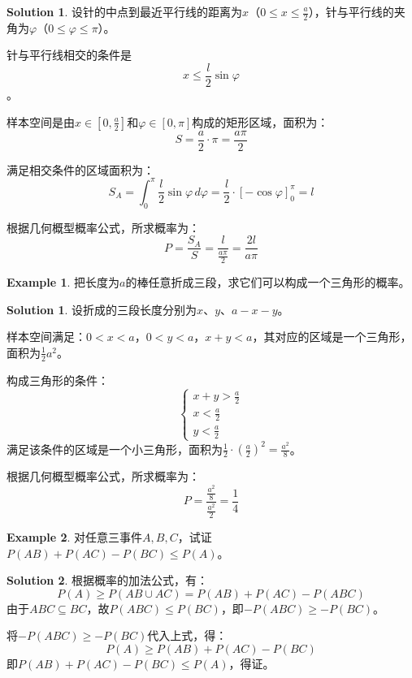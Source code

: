 \documentclass[oneside]{book}
\theoremstyle{definition}
\newtheorem{example}{Example}[section]
\newtheorem*{sol}{Solution}
\newtheorem*{solution}{Solution}
\begin{document}
	\begin{sol}
		设针的中点到最近平行线的距离为\( x \)（\( 0 \leq x \leq \frac{a}{2} \)），针与平行线的夹角为\( \varphi \)（\( 0 \leq \varphi \leq \pi \)）。
		
		针与平行线相交的条件是 \[x \leq \frac{l}{2} \sin\varphi \]。
		
		样本空间是由\( x \in [0, \frac{a}{2}] \)和\( \varphi \in [0, \pi] \)构成的矩形区域，面积为：
		\[
		S = \frac{a}{2} \cdot \pi = \frac{a\pi}{2}
		\]
		
		满足相交条件的区域面积为：
		\[
		S_A = \int_{0}^{\pi} \frac{l}{2} \sin\varphi \, d\varphi = \frac{l}{2} \cdot [-\cos\varphi]_{0}^{\pi} = l
		\]
		
		根据几何概型概率公式，所求概率为：
		\[
		P = \frac{S_A}{S} = \frac{l}{\frac{a\pi}{2}} = \frac{2l}{a\pi}
		\]
	\end{sol}
	\begin{example}
		把长度为\( a \)的棒任意折成三段，求它们可以构成一个三角形的概率。
	\end{example}
	
	\begin{solution}
		设折成的三段长度分别为\( x \)、\( y \)、\( a - x - y \)。
		
		样本空间满足：\( 0 < x < a \)，\( 0 < y < a \)，\( x + y < a \)，其对应的区域是一个三角形，面积为\( \frac{1}{2}a^2 \)。
		
		构成三角形的条件：
		\[
		\begin{cases}
			x + y > \frac{a}{2} \\
			x < \frac{a}{2} \\
			y < \frac{a}{2}
		\end{cases}
		\]
		满足该条件的区域是一个小三角形，面积为\( \frac{1}{2} \cdot \left( \frac{a}{2} \right)^2 = \frac{a^2}{8} \)。
		
		根据几何概型概率公式，所求概率为：
		\[
		P = \frac{\frac{a^2}{8}}{\frac{a^2}{2}} = \frac{1}{4}
		\]
	\end{solution}
	
	\begin{example}
		对任意三事件\( A,B,C \)，试证\( P(AB) + P(AC) - P(BC) \leq P(A) \)。
	\end{example}
	
	\begin{solution}
		根据概率的加法公式，有：
		\[
		P(A) \geq P(AB \cup AC) = P(AB) + P(AC) - P(ABC)
		\]
		由于\( ABC \subseteq BC \)，故\( P(ABC) \leq P(BC) \)，即\( -P(ABC) \geq -P(BC) \)。
		
		将\( -P(ABC) \geq -P(BC) \)代入上式，得：
		\[
		P(A) \geq P(AB) + P(AC) - P(BC)
		\]
		即\( P(AB) + P(AC) - P(BC) \leq P(A) \)，得证。
	\end{solution}
\end{document}
